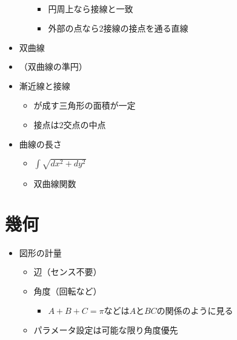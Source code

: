 \documentclass[dvipdfmx,uplatex]{jsarticle}
\begin{document}
\begin{itemize}
\begin{itemize}
\begin{itemize}
			\item $ 円周上なら接線と一致$
			\item $ 外部の点なら2接線の接点を通る直線$
		\end{itemize}
	\end{itemize}
	\item $ 双曲線$
	\item $ （双曲線の準円）$
	\item $ 漸近線と接線$
	\begin{itemize}
		\item $ が成す三角形の面積が一定$
		\item $ 接点は2交点の中点$
	\end{itemize}
	\item $ 曲線の長さ$
	\begin{itemize}
		\item $ \int \sqrt{dx^2 + dy^2}$
		\item $ 双曲線関数$
	\end{itemize}
\end{itemize}

\section{幾何}
\begin{itemize}
	\item $ 図形の計量$
	\begin{itemize}
		\item $ 辺（センス不要）$
		\item $ 角度（回転など）$
		\begin{itemize}
			\item $ A+B+C= \pi などはAとBCの関係のように見る$
		\end{itemize}
		\item $ パラメータ設定は可能な限り角度優先$
	\end{itemize}
\end{itemize}
\end{document}

